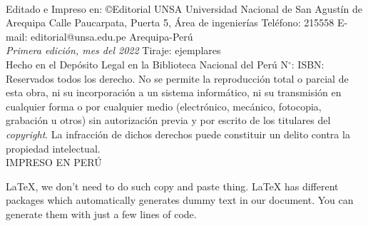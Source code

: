 \documentclass{wileySev}
\begin{document}
\sloppy 
\decimalpoint
\nocite{*}
\setlength\tabcolsep{3pt}
\newpage\null\thispagestyle{empty}\newpage
\newpage\null\thispagestyle{empty}\newpage







\halftitlepage
\titlepage

\begin{copyrightpage}{}\\

Editado e Impreso en:
\copyright Editorial UNSA
Universidad Nacional de San Agustín de Arequipa
Calle Paucarpata, Puerta 5, Área de ingenierías
Teléfono: 215558
E-mail: editorial@unsa.edu.pe
Arequipa-Perú\\

\textit{Primera edici\'on, mes del 2022} 
Tiraje:   ejemplares\\



Hecho en el Depósito Legal en la Biblioteca Nacional del Perú N$^\circ$: 
ISBN: \\



Reservados todos los derecho. No se permite la reproducción total o 
parcial de esta obra, ni su incorporación a un sistema informático, 
ni su transmisión en cualquier forma o por cualquier medio (electrónico,
mecánico, fotocopia, grabación u otros) sin autorización previa y por 
escrito de los titulares del \textit{copyright}. La infracción de dichos derechos puede 
constituir un delito contra la propiedad intelectual.\\

IMPRESO EN PERÚ

\end{copyrightpage}

\begin{dedication}
LaTeX, we don’t need to do such copy and paste thing. LaTeX has different packages which automatically generates dummy text in our document. You can generate them with just a few lines of code.
\end{dedication}
\contentsinbrief
\end{document}
